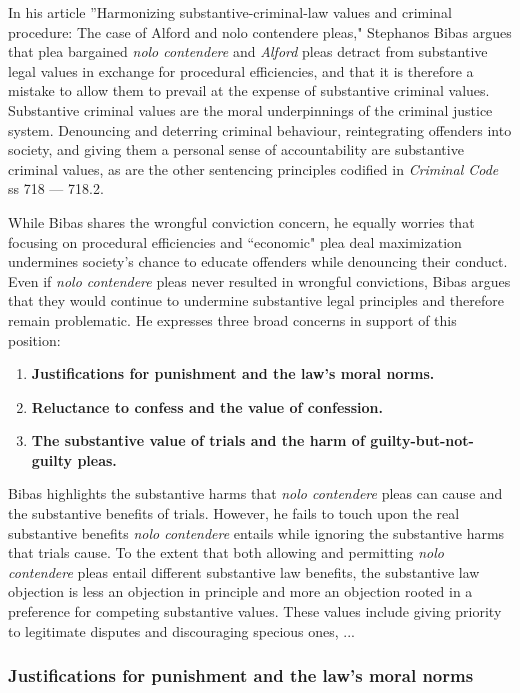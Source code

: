 In his article ''Harmonizing substantive-criminal-law values and criminal procedure: The case of Alford and nolo contendere pleas," Stephanos Bibas argues that plea bargained \textit{nolo contendere} and \textit{Alford} pleas detract from substantive legal values in exchange for procedural efficiencies, and that it is therefore a mistake to allow them to prevail at the expense of substantive criminal values. Substantive criminal values are the moral underpinnings of the criminal justice system. Denouncing and deterring criminal behaviour, reintegrating offenders into society, and giving them a personal sense of accountability are substantive criminal values, as are the other sentencing principles codified in \textit{Criminal Code} ss 718 — 718.2.

While Bibas shares the wrongful conviction concern, he equally worries that focusing on procedural efficiencies and ``economic" plea deal maximization undermines society's chance to educate offenders while denouncing their conduct. Even if \textit{nolo contendere} pleas never resulted in wrongful convictions, Bibas argues that they would continue to undermine substantive legal principles and therefore remain problematic. He expresses three broad concerns in support of this position:

\begin{enumerate}
    \item \textbf{Justifications for punishment and the law's moral norms.} 
    \item \textbf{Reluctance to confess and the value of confession.}
    \item \textbf{The substantive value of trials and the harm of guilty-but-not-guilty pleas.}
\end{enumerate}

Bibas highlights the substantive harms that \textit{nolo contendere} pleas can cause and the substantive benefits of trials. However, he fails to touch upon the real substantive benefits \textit{nolo contendere} entails while ignoring the substantive harms that trials cause. To the extent that both allowing and permitting \textit{nolo contendere} pleas entail different substantive law benefits, the substantive law objection is less an objection in principle and more an objection rooted in a preference for competing substantive values. These values include giving priority to legitimate disputes and discouraging specious ones, ... 

\subsubsection{Justifications for punishment and the law's moral norms}

